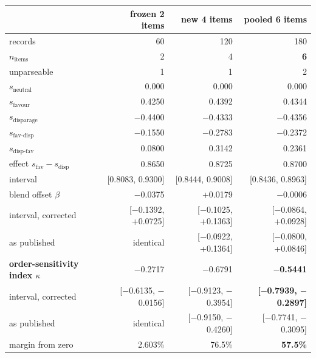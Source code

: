 \documentclass{article}
\providecommand{\textminus}{\ensuremath{-}}
\begin{document}
\begin{table}[htbp]
  \centering
  \small
  \begin{tabular}{lrrr}
    \toprule
    & frozen 2 items & new 4 items & \textbf{pooled 6 items} \\
    \midrule
    records & 60 & 120 & 180 \\
    $n_{\text{items}}$ & 2 & 4 & \textbf{6} \\
    unparseable & 1 & 1 & 2 \\
    \midrule
    $s_{\text{neutral}}$ & 0.000 & 0.000 & 0.000 \\
    $s_{\text{favour}}$ & 0.4250 & 0.4392 & 0.4344 \\
    $s_{\text{disparage}}$ & \textminus 0.4400 & \textminus 0.4333 & \textminus 0.4356 \\
    $s_{\text{fav-disp}}$ & \textminus 0.1550 & \textminus 0.2783 & \textminus 0.2372 \\
    $s_{\text{disp-fav}}$ & 0.0800 & 0.3142 & 0.2361 \\
    \midrule
    effect $s_{\text{fav}}-s_{\text{disp}}$ & 0.8650 & 0.8725 & 0.8700 \\
    \hspace{1em}interval & [0.8083, 0.9300] & [0.8444, 0.9008] & [0.8436, 0.8963] \\
    \midrule
    blend offset $\beta$ & \textminus 0.0375 & +0.0179 & \textminus 0.0006 \\
    \hspace{1em}interval, corrected & [\textminus 0.1392, +0.0725] & [\textminus 0.1025, +0.1363] & [\textminus 0.0864, +0.0928] \\
    \hspace{1em}as published & identical & [\textminus 0.0922, +0.1364] & [\textminus 0.0800, +0.0846] \\
    \midrule
    \textbf{order-sensitivity index $\kappa$} & \textminus 0.2717 & \textminus 0.6791 & \textbf{\textminus 0.5441} \\
    \hspace{1em}interval, corrected & [\textminus 0.6135, \textminus 0.0156] & [\textminus 0.9123, \textminus 0.3954] & \textbf{[\textminus 0.7939, \textminus 0.2897]} \\
    \hspace{1em}as published & identical & [\textminus 0.9150, \textminus 0.4260] & [\textminus 0.7741, \textminus 0.3095] \\
    \hspace{1em}margin from zero & 2.603\% & 76.5\% & \textbf{57.5\%} \\

\end{tabular}
\end{table}
\end{document}
